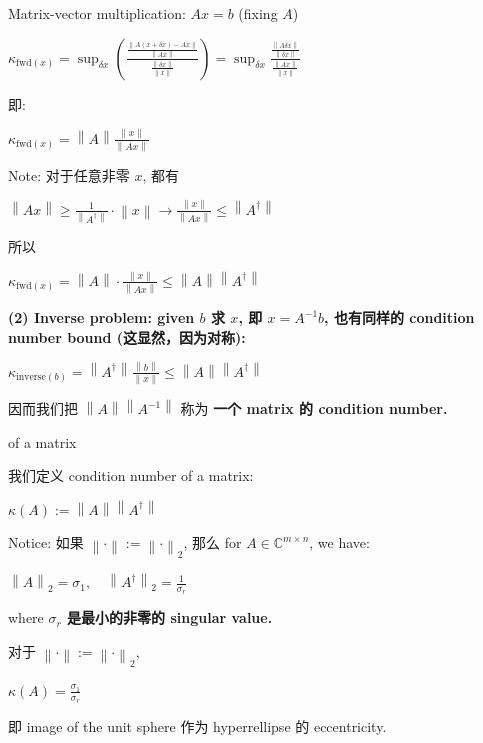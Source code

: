 \begin{example}

Matrix-vector multiplication: \(Ax = b\) (fixing \(A\))

\(\kappa_{\text{fwd}{(x)}} = \sup_{\delta x}\left( \frac{\frac{\left\| {A\left( {x + \delta x} \right) - Ax} \right\|}{\left\| {Ax} \right\|}}{\frac{\left\| {\delta x} \right\|}{\left\| x \right\|}} \right) = \sup_{\delta x}\frac{\frac{\left\| {A\delta x} \right\|}{\left\| {\delta x} \right\|}}{\frac{\left\| {Ax} \right\|}{\left\| x \right\|}}\)

即:

\(\kappa_{\text{fwd}{(x)}} = \left\| A \right\|\frac{\left\| x \right\|}{\left\| {Ax} \right\|}\)

Note: 对于任意非零 \(x\), 都有

\(\left\| {Ax} \right\| \geq \frac{1}{\left\| A^{\dagger} \right\|} \cdot \left\| x \right\|\rightarrow\frac{\left\| x \right\|}{\left\| {Ax} \right\|} \leq \left\| A^{\dagger} \right\|\)

所以

\(\kappa_{\text{fwd}{(x)}} = \left\| A \right\| \cdot \frac{\left\| x \right\|}{\left\| {Ax} \right\|} \leq \left\| A \right\|\left\| A^{\dagger} \right\|\)

\textbf{(2) Inverse problem: given \(b\) 求 \(x\), 即 \(x = A^{- 1}b\), 也有同样的 condition number bound (这显然，因为对称):}

\(\kappa_{\text{inverse}{(b)}} = \left\| A^{\dagger} \right\|\frac{\left\| b \right\|}{\left\| x \right\|} \leq \left\| A \right\|\left\| A^{\dagger} \right\|\)

因而我们把 \(\left\| A \right\|\left\| A^{- 1} \right\|\) 称为 \textbf{一个 matrix 的 condition number.}

\begin{definition}{ of a matrix}

我们定义 condition number of a matrix:

\(\kappa(A) := \left\| A \right\|\left\| A^{\dagger} \right\|\)

Notice: 如果 \(\left\| \cdot \right\| := \left\| \cdot \right\|_{2}\), 那么 for \(A \in \mathbb{C}^{m \times n}\), we have:

\(\left\| A \right\|_{2} = \sigma_{1},\quad\left\| A^{\dagger} \right\|_{2} = \frac{1}{\sigma_{r}}\)

where \textbf{\(\sigma_{r}\) 是最小的非零的 singular value.}

\end{definition}

对于 \(\left\| \cdot \right\| := \left\| \cdot \right\|_{2}\),

\(\kappa(A) = \frac{\sigma_{1}}{\sigma_{r}}\)

即 image of the unit sphere 作为 hyperrellipse 的 eccentricity.

\end{example}

